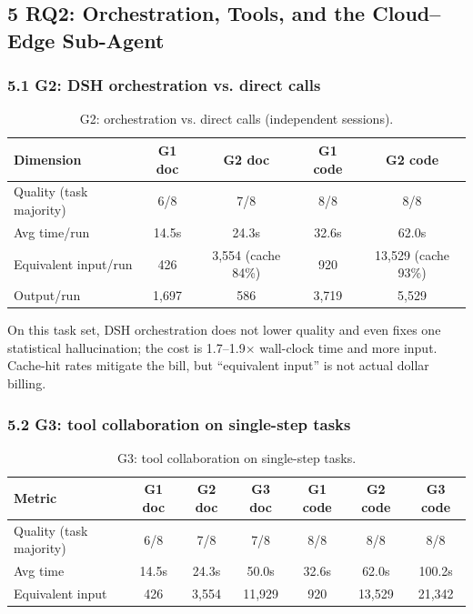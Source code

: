 \documentclass[
]{article}
\begin{document}
\subsection{5 RQ2: Orchestration, Tools, and the Cloud--Edge Sub-Agent}
\subsubsection{5.1 G2: DSH orchestration vs. direct calls}
\begin{table}[ht]
\centering
\small
\begin{tabular}{lcccc}
\toprule
Dimension & G1 doc & G2 doc & G1 code & G2 code \\
\midrule
Quality (task majority) & 6/8 & 7/8 & 8/8 & 8/8 \\
Avg time/run & 14.5s & 24.3s & 32.6s & 62.0s \\
Equivalent input/run & 426 & 3,554 (cache 84\%) & 920 & 13,529 (cache 93\%) \\
Output/run & 1,697 & 586 & 3,719 & 5,529 \\
\bottomrule
\end{tabular}
\caption{G2: orchestration vs. direct calls (independent sessions).}
\label{tab:g2}
\end{table}

On this task set, DSH orchestration does not lower quality and even fixes one statistical hallucination; the cost is 1.7--1.9$\times$ wall-clock time and more input. Cache-hit rates mitigate the bill, but ``equivalent input'' is not actual dollar billing.

\subsubsection{5.2 G3: tool collaboration on single-step tasks}
\begin{table}[ht]
\centering
\small
\begin{tabular}{lcccccc}
\toprule
Metric & G1 doc & G2 doc & G3 doc & G1 code & G2 code & G3 code \\
\midrule
Quality (task majority) & 6/8 & 7/8 & 7/8 & 8/8 & 8/8 & 8/8 \\
Avg time & 14.5s & 24.3s & 50.0s & 32.6s & 62.0s & 100.2s \\
Equivalent input & 426 & 3,554 & 11,929 & 920 & 13,529 & 21,342 \\
\bottomrule
\end{tabular}
\caption{G3: tool collaboration on single-step tasks.}
\label{tab:g3}
\end{table}
\end{document}
